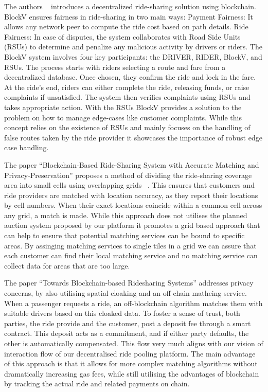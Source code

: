 The authors ~\cite{Pal.}  introduces a decentralized ride-sharing solution using blockchain. BlockV ensures fairness in ride-sharing in two main ways:
Payment Fairness: It allows any network peer to compute the ride cost based on path details.
Ride Fairness: In case of disputes, the system collaborates with Road Side Units (RSUs) to determine and penalize any malicious activity by drivers or riders.
The BlockV system involves four key participants: the DRIVER, RIDER, BlockV, and RSUs. The process starts with riders selecting a route and fare from a decentralized database. Once chosen, they confirm the ride and lock in the fare. At the ride's end, riders can either complete the ride, releasing funds, or raise complaints if unsatisfied. The system then verifies complaints using RSUs and takes appropriate action.
With the RSUs BlockV provides a solution to the problem on how to manage edge-cases like customer complaints. While this concept relies on the existence of RSUs and mainly focuses on the handling of false routes taken by the ride provider it showcases the importance of robust edge case handling.

The paper ``Blockchain-Based Ride-Sharing System with Accurate Matching and Privacy-Preservation'' proposes a method of dividing the ride-sharing coverage area into small cells using overlapping grids ~\cite{Badr.}. This ensures that customers and ride providers are matched with location accuracy, as they report their locations by cell numbers. When their exact locations coincide within a common cell across any grid, a match is made. While this approach does not utilises the planned auction system proposed by our platform it promotes a grid based approach that can help to ensure that potential matching services can be bound to specific areas. By assinging matching services to single tiles in a grid we can assure that each customer can find their local matching service and no matching service can collect data for areas that are too large.


The paper ``Towards Blockchain-based Ridesharing Systems'' addresses privacy concerns, by also utilising spatial cloaking and an off chain mathcing service.~\cite{Vazquez.} When a passenger requests a ride, an off-blockchain algorithm matches them with suitable drivers based on this cloaked data. To foster a sense of trust, both parties, the ride provide and the customer, post a deposit fee through a smart contract. This deposit acts as a commitment, and if either party defaults, the other is automatically compensated. This flow very much aligns with our vision of interaction flow of our decentralised ride pooling platform. The main advantage of this approach is that it allows for more complex matching algorithms without dramatically increasing gas fees, while still utilising the advantages of blockchain by tracking the actual ride and related payments on chain. 

